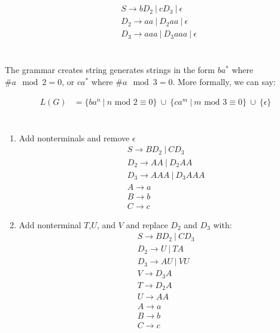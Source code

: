 \documentclass[letterpaper]{article}
\theoremstyle{plain}
\theoremstyle{definition}
\theoremstyle{remark}
\begin{document}
\section{}
\begin{align*}
    &S \to bD_2~|~cD_3~|~\epsilon\\
    &D_2 \to aa~|~D_2aa~|~\epsilon\\
    &D_3 \to aaa~|~D_3aaa~|~\epsilon
\end{align*}

\section*{\thesubsection}
The grammar creates string generates strings in the form $ba^*$ where $\#a\mod 2 = 0$, or $ca^*$ where $\#a\mod 3 = 0$. More formally, we can say:

\begin{align*}
    L(G)&=\{ba^n~|~n\text{ mod }2\equiv0\}~\cup~\{ca^m~|~m\text{ mod }3\equiv0\}~\cup~\{\epsilon\}
\end{align*}

\section*{\thesubsection}
\begin{enumerate}
    \item Add nonterminals and remove $\epsilon$
    \begin{align*}
        &S \to BD_2~|~CD_3\\
        &D_2 \to AA~|~D_2AA\\
        &D_3 \to AAA~|~D_3AAA\\
        &A \to a\\
        &B \to b\\
        &C \to c
    \end{align*} 
    \item Add nonterminal $T$,$U$, and $V$ and replace $D_2$ and $D_3$ with:
    \begin{align*}
        &S \to BD_2~|~CD_3\\
        &D_2 \to U~|~TA\\
        &D_3 \to AU~|~VU\\
        &V \to D_3A\\
        &T \to D_2A\\
        &U \to AA\\
        &A \to a\\
        &B \to b\\
        &C \to c
    \end{align*} 
\end{enumerate}
\end{document}
